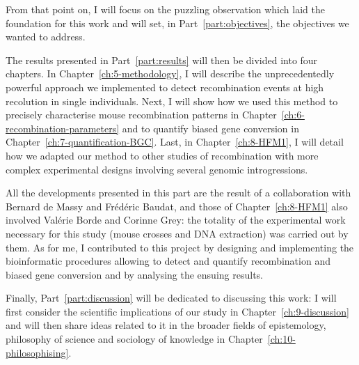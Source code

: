 From that point on, I will focus on the puzzling observation which laid the foundation for this work and will set, in Part~\ref{part:objectives}, the objectives we wanted to address.


The results presented in Part~\ref{part:results} will then be divided into four chapters.
In Chapter~\ref{ch:5-methodology}, I will describe the unprecedentedly powerful approach we implemented to detect recombination events at high recolution in single individuals.
Next, I will show how we used this method to precisely characterise mouse recombination patterns in Chapter~\ref{ch:6-recombination-parameters} and to quantify biased gene conversion in Chapter~\ref{ch:7-quantification-BGC}.
Last, in Chapter~\ref{ch:8-HFM1}, I will detail how we adapted our method to other studies of recombination with more complex experimental designs involving several genomic introgressions.
\begin{mccorrection}
	All the developments presented in this part are the result of a collaboration with Bernard de Massy and Frédéric Baudat, and those of Chapter~\ref{ch:8-HFM1} also involved Valérie Borde and Corinne Grey: the totality of the experimental work necessary for this study (mouse crosses and DNA extraction) was carried out by them.
	As for me, I contributed to this project by designing and implementing the bioinformatic procedures allowing to detect and quantify recombination and biased gene conversion and by analysing the ensuing results.
\end{mccorrection}

Finally, Part~\ref{part:discussion} will be dedicated to discussing this work: I will first consider the scientific implications of our study in Chapter~\ref{ch:9-discussion} and will then share ideas related to it in the broader fields of epistemology, philosophy of science and sociology of knowledge in Chapter~\ref{ch:10-philosophising}.










